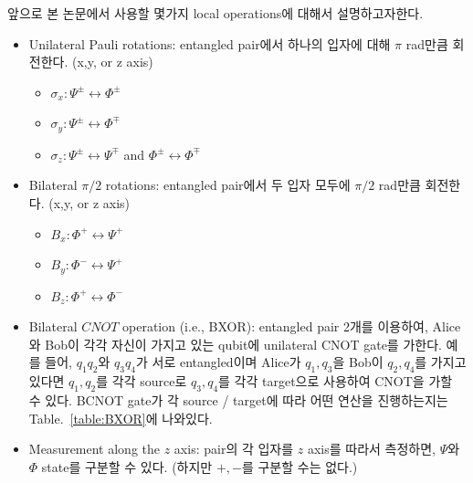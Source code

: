 \documentclass[
]{kaohandt}
\begin{document}
앞으로 본 논문에서 사용할 몇가지 local operations에 대해서 설명하고자한다. 
\begin{itemize}
    \item Unilateral Pauli rotations: entangled pair에서 하나의 입자에 대해 $\pi$ rad만큼 회전한다. (x,y, or z axis)
    \begin{itemize}
        \item $\sigma_x: \Psi^{\pm} \leftrightarrow \Phi^\pm$
        \item $\sigma_y: \Psi^{\pm} \leftrightarrow \Phi^\mp$
        \item $\sigma_z: \Psi^{\pm} \leftrightarrow \Psi^{\mp}$ and $\Phi^{\pm} \leftrightarrow \Phi^{\mp}$
    \end{itemize}
    \item Bilateral $\pi/2$ rotations: entangled pair에서 두 입자 모두에 $\pi/2$ rad만큼 회전한다. (x,y, or z axis)
    \begin{itemize}
        \item $B_x: \Phi^{+} \leftrightarrow \Psi^+$
        \item $B_y: \Phi^{-} \leftrightarrow \Psi^+$
        \item $B_z: \Phi^{+} \leftrightarrow \Phi^{-}$
    \end{itemize}
    \item Bilateral $CNOT$ operation (i.e., BXOR): entangled pair 2개를 이용하여, Alice와 Bob이 각각 자신이 가지고 있는 qubit에 unilateral CNOT gate를 가한다. 예를 들어, $q_1q_2$와 $q_3q_4$가 서로 entangled이며 Alice가 $q_1, q_3$을 Bob이 $q_2, q_4$를 가지고 있다면 $q_1, q_2$를 각각 source로 $q_3, q_4$를 각각 target으로 사용하여 CNOT을 가할 수 있다. 
    BCNOT gate가 각 source / target에 따라 어떤 연산을 진행하는지는 Table.~\ref{table:BXOR}에 나와있다.
    \item Measurement along the $z$ axis: pair의 각 입자를 $z$ axis를 따라서 측정하면, $\Psi$와 $\Phi$ state를 구분할 수 있다. (하지만 $+, -$를 구분할 수는 없다.)
\end{itemize}
\end{document}
